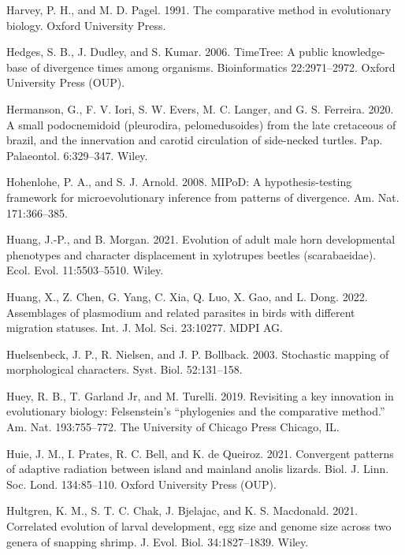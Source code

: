 \documentclass[fleqn,10pt,lineno]{wlpeerj} %
\newlength{\cslhangindent}
\newlength{\cslentryspacingunit} %
\newenvironment{CSLReferences}[2] %
 {%
  \setlength{\parindent}{0pt}
  \ifodd #1
  \let\oldpar\par
  \def\par{\hangindent=\cslhangindent\oldpar}
  \fi
  \setlength{\parskip}{#2\cslentryspacingunit}
 }%
 {}
\begin{document}
\begin{CSLReferences}{1}{0}
\leavevmode{}%
Harvey, P. H., and M. D. Pagel. 1991. The comparative method in evolutionary biology. Oxford University Press.

\leavevmode{}%
Hedges, S. B., J. Dudley, and S. Kumar. 2006. {TimeTree}: A public knowledge-base of divergence times among organisms. Bioinformatics 22:2971--2972. Oxford University Press (OUP).

\leavevmode{}%
Hermanson, G., F. V. Iori, S. W. Evers, M. C. Langer, and G. S. Ferreira. 2020. A small podocnemidoid (pleurodira, pelomedusoides) from the late cretaceous of brazil, and the innervation and carotid circulation of side-necked turtles. Pap. Palaeontol. 6:329--347. Wiley.

\leavevmode{}%
Hohenlohe, P. A., and S. J. Arnold. 2008. {MIPoD}: A hypothesis-testing framework for microevolutionary inference from patterns of divergence. Am. Nat. 171:366--385.

\leavevmode{}%
Huang, J.-P., and B. Morgan. 2021. Evolution of adult male horn developmental phenotypes and character displacement in xylotrupes beetles (scarabaeidae). Ecol. Evol. 11:5503--5510. Wiley.

\leavevmode{}%
Huang, X., Z. Chen, G. Yang, C. Xia, Q. Luo, X. Gao, and L. Dong. 2022. Assemblages of plasmodium and related parasites in birds with different migration statuses. Int. J. Mol. Sci. 23:10277. MDPI AG.

\leavevmode{}%
Huelsenbeck, J. P., R. Nielsen, and J. P. Bollback. 2003. Stochastic mapping of morphological characters. Syst. Biol. 52:131--158.

\leavevmode{}%
Huey, R. B., T. Garland Jr, and M. Turelli. 2019. Revisiting a key innovation in evolutionary biology: Felsenstein's {``phylogenies and the comparative method.''} Am. Nat. 193:755--772. The University of Chicago Press Chicago, IL.

\leavevmode{}%
Huie, J. M., I. Prates, R. C. Bell, and K. de Queiroz. 2021. Convergent patterns of adaptive radiation between island and mainland anolis lizards. Biol. J. Linn. Soc. Lond. 134:85--110. Oxford University Press (OUP).

\leavevmode{}%
Hultgren, K. M., S. T. C. Chak, J. Bjelajac, and K. S. Macdonald. 2021. Correlated evolution of larval development, egg size and genome size across two genera of snapping shrimp. J. Evol. Biol. 34:1827--1839. Wiley.


\end{CSLReferences}
\end{document}
